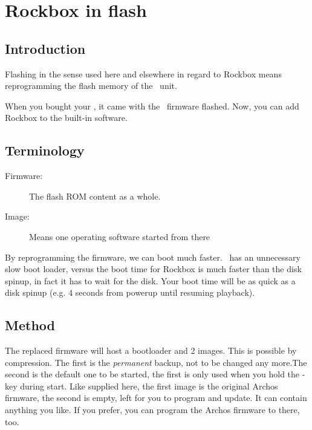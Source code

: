 \section{\label{ref:Rockboxinflash}Rockbox in flash}


\subsection{Introduction}
Flashing in the sense used here and elsewhere in regard to Rockbox means 
reprogramming the flash memory of the \playerman\ unit.

When you bought your \playerman, it came with the \playerman\ firmware flashed.
Now, you can add Rockbox to the built-in software.

\subsection{Terminology}
\begin{description}
\item[Firmware: ] The flash ROM content as a whole.
\item[Image: ] Means one operating software started from there
\end{description}

By reprogramming the firmware, we can boot much faster. \playerman\ has an 
unnecessary slow boot loader, versus the boot time for Rockbox is much faster 
than the disk spinup, in fact it has to wait for the disk. Your boot time will 
be as quick as a disk spinup (e.g. 4 seconds from powerup until resuming 
playback).

\subsection{Method}

The replaced firmware will host a bootloader and 2 images. This is possible by 
compression. The first is the \emph{permanent} backup, not to be changed any 
more.The second is the default one to be started, the first is only used when 
you hold the  -key during start. Like supplied here, the first image 
is the original Archos firmware, the second is empty, left for you to program 
and update. It can contain anything you like. If you prefer, you can program 
the Archos firmware to there, too.

